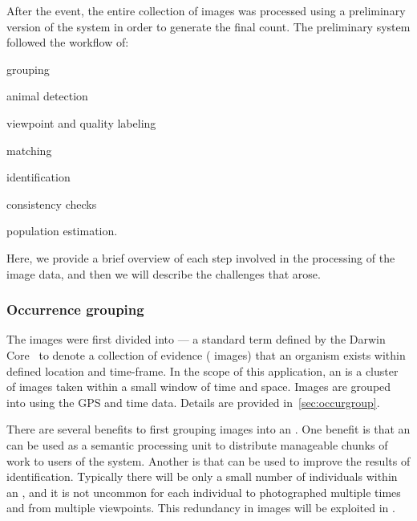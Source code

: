         After the event, the entire collection of images was processed using a preliminary version of the system in
        order to generate the final count. The preliminary system followed the workflow of: %
        \begin{enumin}
            \item \occurrence{} grouping  %
            \item animal detection %
            \item viewpoint and quality labeling  %
            \item \intraoccurrence{} matching %
            \item \vsexemplar{} identification %
            \item consistency checks  %
            \item population estimation.  %
        \end{enumin}
        Here, we provide a brief overview of each step involved in the processing of the \GZC{} image data, and then we
        will describe the challenges that arose.

        \subsubsection{Occurrence grouping}
            The images were first divided into \glossterm{\occurrences{}} --- a standard term defined by the Darwin
            Core~\cite{wieczorek_darwin_2012} to denote a collection of evidence (\eg{} images) that an organism exists
            within defined location and time-frame. In the scope of this application, an \occurrence{} is a cluster of
            images taken within a small window of time and space. Images are grouped into \occurrences{} using the GPS
            and time data. Details are provided in~\cref{sec:occurgroup}.

            There are several benefits to first grouping images into an \occurrence{}. One benefit is that an
            \occurrence{} can be used as a semantic processing unit to distribute manageable chunks of work to users of
            the system. Another is that \occurrences{} can be used to improve the results of identification. Typically
            there will be only a small number of individuals within an \occurrence{}, and it is not uncommon for each
            individual to photographed multiple times and from multiple viewpoints. This redundancy in images will be
            exploited in .

